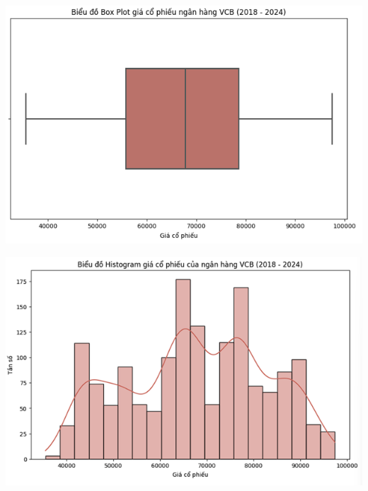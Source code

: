 \documentclass[conference]{IEEEtran}
\begin{document}
\begin{minipage}{0.21\textwidth}
    \centering
    \includegraphics[width=\linewidth]{images/Statistic/vcb_boxplot.png}
    \label{fig:image1}
\end{minipage}
\hfill
\begin{minipage}{0.21\textwidth}
    \centering
    \includegraphics[width=\linewidth]{images/Statistic/vcb_histogram.png}
    \label{fig:image2}
\end{minipage}
\end{document}
